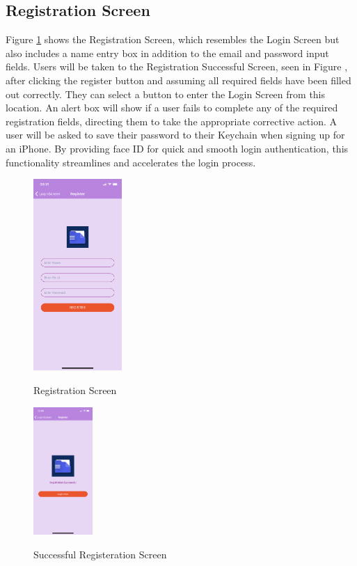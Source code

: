 \subsection{Registration Screen} 
Figure \ref{image:registeration} shows the Registration Screen, which resembles the Login Screen but also includes a name entry box in addition to the email and password input fields. Users will be taken to the Registration Successful Screen, seen in Figure , after clicking the register button and assuming all required fields have been filled out correctly. They can select a button to enter the Login Screen from this location. An alert box will show if a user fails to complete any of the required registration fields, directing them to take the appropriate corrective action.
\newline \newline
A user will be asked to save their password to their Keychain when signing up for an iPhone. By providing face ID for quick and smooth login authentication, this functionality streamlines and accelerates the login process.
\begin{figure}[h!]
    \includegraphics[width=0.3\textwidth]
    {images/Registration.png}
    \centering
    \label{image:registeration}
    \caption{Registration Screen}
\end{figure}
\begin{figure}[h!]
    \includegraphics[width=0.2\textwidth]
    {images/RegSuccess.png}
    \centering
    \label{image:regsuccess}
    \caption{Successful Registeration Screen}
\end{figure}

